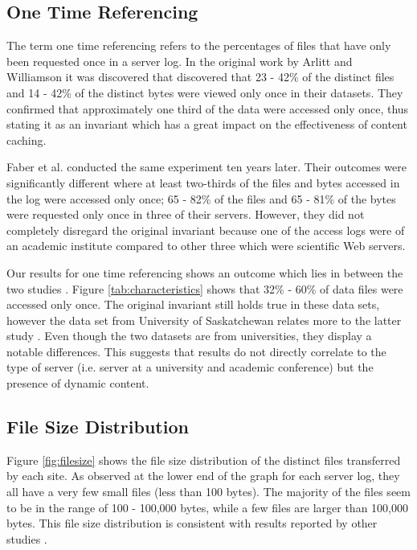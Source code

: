 \documentclass[10pt,conference]{IEEEtran}
\begin{document}
\subsection{One Time Referencing} %
\label{sub:one_time_referencing}
The term one time referencing refers to the percentages of files that have only been requested once in a server log. In the original work by Arlitt and Williamson \cite{invariants} it was discovered that discovered that 23 - 42\% of the distinct files and 14 - 42\% of the distinct bytes were viewed only once in their datasets. They confirmed that approximately one third of the data were accessed only once, thus stating it as an invariant which has a great impact on the effectiveness of content caching.

Faber et al. \cite{Faber} conducted the same experiment ten years later. Their outcomes were significantly different where at least two-thirds of the files and bytes accessed in the log were accessed only once; 65 - 82\% of the files and 65 - 81\% of the bytes were requested only once in three of their servers. However, they did not completely disregard the original invariant because one of the access logs were of an academic institute compared to other three which were scientific Web servers.

Our results for one time referencing shows an outcome which lies in between the two studies \cite{invariants, Faber}. Figure \ref{tab:characteristics} shows that 32\% - 60\% of data files were accessed only once. The original invariant still holds true in these data sets, however the data set from University of Saskatchewan relates more to the latter study \cite{Faber}. Even though the two datasets are from universities, they display a notable differences. This suggests that results do not directly correlate to the type of server (i.e. server at a university and academic conference) but the presence of dynamic content.

\subsection{File Size Distribution} %
\label{sub:file_size_distribution}
Figure \ref{fig:filesize} shows the file size distribution of the distinct files transferred by each site. As observed at the lower end of the graph for each server log, they all have a very few small files (less than 100 bytes). The majority of the files seem to be in the range of 100 - 100,000 bytes, while a few files are larger than 100,000 bytes. This file size distribution is consistent with results reported by other studies \cite{keynote, Braun}.
\end{document}
